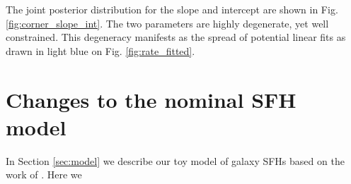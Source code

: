\documentclass[fleqn,usenatbib]{mnras}
\begin{document}
The joint posterior distribution for the slope and intercept are shown in Fig. \ref{fig:corner_slope_int}. The two parameters are highly degenerate, yet well constrained. This degeneracy manifests as the spread of potential linear fits as drawn in light blue on Fig. \ref{fig:rate_fitted}.

\section{Changes to the nominal SFH model}
\label{appendix:model_adjustments}
In Section \ref{sec:model} we describe our toy model of galaxy SFHs based on the work of \citet{Childress2014}. Here we 




\bsp	%
\label{lastpage}
\end{document}
